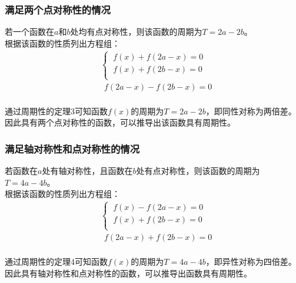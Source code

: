 \documentclass[UTF8]{ctexart}
\begin{document}
\subsubsection{满足两个点对称性的情况}
    \setcounter{equation}{0}
    若一个函数在$a$和$b$处均有点对称性，则该函数的周期为$T=2a-2b$。\\[3mm]
    根据该函数的性质列出方程组：
    \begin{align}
        &\begin{cases}
            ~f(x)+f(2a-x)=0\\[1mm]
            ~f(x)+f(2b-x)=0\\[1mm]
        \end{cases}\\[3mm]     
        &~~f(2a-x)-f(2b-x)=0
    \end{align}\\
    通过周期性的定理$3$可知函数$f(x)$的周期为$T=2a-2b$，即同性对称为两倍差。\\[3mm]
    因此具有两个点对称性的函数，可以推导出该函数具有周期性。\vspace{5pt}

\subsubsection{满足轴对称性和点对称性的情况}
    \setcounter{equation}{0}
    若函数在$a$处有轴对称性，且函数在$b$处有点对称性，则该函数的周期为$T=4a-4b$。\\[3mm]
    根据该函数的性质列出方程组：
    \begin{align}
        &\begin{cases}
            ~f(x)-f(2a-x)=0\\[1mm]
            ~f(x)+f(2b-x)=0\\[1mm]
        \end{cases}\\[3mm]     
        &~~f(2a-x)+f(2b-x)=0
    \end{align}\\
    通过周期性的定理$4$可知函数$f(x)$的周期为$T=4a-4b$，即异性对称为四倍差。\\[3mm]
    因此具有轴对称性和点对称性的函数，可以推导出函数具有周期性。

\newpage
\end{document}
